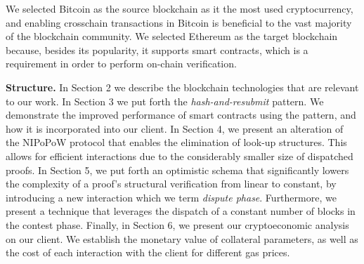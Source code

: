 We selected Bitcoin as the source blockchain as it the most used cryptocurrency,
and enabling crosschain transactions in Bitcoin is beneficial to the vast
majority of the blockchain community. We selected Ethereum as the target blockchain
because, besides its popularity, it supports smart contracts, which is a
requirement in order to perform on-chain verification.


\noindent
\textbf{Structure.} In Section 2 we describe the blockchain technologies that
are relevant to our work. In Section 3 we put forth the
\emph{hash-and-resubmit} pattern. We demonstrate the improved performance of
smart contracts using the pattern, and how it is incorporated into our
client. In Section 4, we present an alteration of the NIPoPoW protocol that
enables the elimination of look-up structures. This allows for efficient
interactions due to the considerably smaller size of dispatched proofs. In
Section 5, we put forth an optimistic schema that significantly lowers the
complexity of a proof's structural verification from linear to constant, by
introducing a new interaction which we term \emph{dispute phase}. Furthermore,
we present a technique that leverages the dispatch of a constant number of blocks
in the contest phase. Finally, in Section 6, we present our cryptoeconomic analysis
on our client. We establish the monetary value of collateral parameters, as well
as the cost of each interaction with the client for different gas prices.
